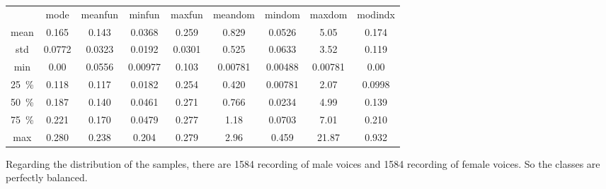 \begin{table}[htb]
		\begin{subtable}{\textwidth}
			\centering
			\begin{tabular}{@{} c c c c  c c c c c @{}}\toprule
			 & mode & meanfun & minfun & maxfun & meandom & mindom & maxdom & modindx \\
			mean & \num{0.165} & \num{0.143} & \num{0.0368} & \num{0.259} & \num{0.829} & \num{0.0526} & \num{5.05} & \num{0.174} \\
			std & \num{0.0772} & \num{0.0323} & \num{0.0192} & \num{0.0301} & \num{0.525} & \num{0.0633} & \num{3.52} & \num{0.119} \\
			min & \num{0.00} & \num{0.0556} & \num{0.00977} & \num{0.103} & \num{0.00781} & \num{0.00488} & \num{0.00781} & \num{0.00} \\
			\SI{25}{\percent} & \num{0.118} & \num{0.117} & \num{0.0182} & \num{0.254} & \num{0.420} & \num{0.00781} & \num{2.07} & \num{0.0998} \\
			\SI{50}{\percent} & \num{0.187} & \num{0.140} & \num{0.0461} & \num{0.271} & \num{0.766} & \num{0.0234} & \num{4.99} & \num{0.139} \\
			\SI{75}{\percent} & \num{0.221} & \num{0.170} & \num{0.0479} & \num{0.277} & \num{1.18} & \num{0.0703} & \num{7.01} & \num{0.210} \\
			max & \num{0.280} & \num{0.238} & \num{0.204} & \num{0.279} & \num{2.96} & \num{0.459} & \num{21.87} & \num{0.932} \\ \bottomrule	
			\end{tabular}
		\end{subtable}\hfill\null%
	\label{tab_data_exploration}
\end{table}

Regarding the distribution of the samples, there are \num{1584} recording of male voices and \num{1584} recording of female voices. So the classes are perfectly balanced.

